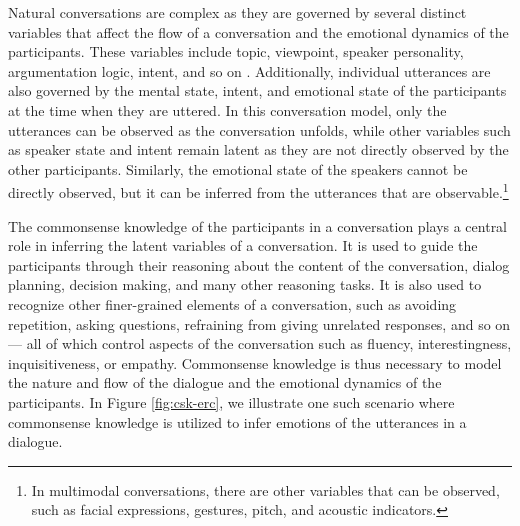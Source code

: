 \documentclass[11pt,a4paper]{article}
\begin{document}
Natural conversations are complex as they are governed by several distinct variables that affect the flow of a conversation and the emotional dynamics of the participants. These variables include topic, viewpoint, speaker personality, argumentation logic, intent, and so on \cite{poria2019emotion}. Additionally, individual utterances are also governed by the mental state, intent, and emotional state of the participants at the time when they are uttered.
In this conversation model,
only the utterances can be observed as the conversation unfolds, while other variables such as speaker state and intent remain latent as they are not directly observed by the other participants. Similarly, the emotional state of the speakers cannot be directly observed, but it can be inferred from the utterances that are observable.\footnote{In multimodal conversations, there are other variables that can be observed, such as facial expressions, gestures, pitch, and acoustic indicators.}

The commonsense knowledge of the participants in a conversation plays a central role in inferring the latent variables of a conversation. It is used to guide the participants through their reasoning about the content of the conversation, dialog planning, decision making, and many other reasoning tasks. It is also used to recognize other finer-grained elements of a conversation, such as avoiding repetition, asking questions, refraining from giving unrelated responses, and so on --- all of which control aspects of the conversation such as fluency, interestingness, inquisitiveness, or empathy. Commonsense knowledge is thus necessary to model the nature and flow of the dialogue and the emotional dynamics of the participants. In Figure \ref{fig:csk-erc}, we illustrate one such scenario where commonsense knowledge is utilized to infer emotions of the utterances in a dialogue.
\end{document}
